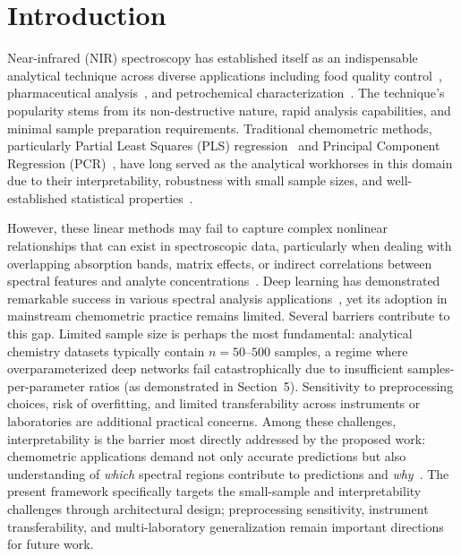 \documentclass[preprint,12pt]{elsarticle}
\begin{document}

\section{Introduction}


Near-infrared (NIR) spectroscopy has established itself as an indispensable analytical technique across diverse applications including food quality control~\cite{osborne1993practical},  pharmaceutical analysis~\cite{roggo2007review}, and petrochemical characterization~\cite{pasquini2018nir}. The technique's popularity stems from its non-destructive nature, rapid analysis capabilities, and minimal sample preparation requirements. Traditional chemometric methods, particularly Partial Least Squares (PLS) regression~\cite{wold2001pls} and Principal Component Regression (PCR)~\cite{naes1985comparison}, have long served as the analytical workhorses in this domain due to their interpretability, robustness with small sample sizes, and well-established statistical properties~\cite{martens1989multivariate}.

However, these linear methods may fail to capture complex nonlinear relationships that can exist in spectroscopic data, particularly when dealing with overlapping absorption bands, matrix effects, or indirect correlations between spectral features and analyte concentrations~\cite{mishra2021deep}. Deep learning has demonstrated remarkable success in various spectral analysis applications~\cite{acquarelli2017convolutional,cui2018modern,liu2021deep}, yet its adoption in mainstream chemometric practice remains limited. Several barriers contribute to this gap. Limited sample size is perhaps the most fundamental: analytical chemistry datasets typically contain $n=50$--$500$ samples, a regime where overparameterized deep networks fail catastrophically due to insufficient samples-per-parameter ratios (as demonstrated in Section~5). Sensitivity to preprocessing choices, risk of overfitting, and limited transferability across instruments or laboratories are additional practical concerns. Among these challenges, interpretability is the barrier most directly addressed by the proposed work: chemometric applications demand not only accurate predictions but also understanding of \textit{which} spectral regions contribute to predictions and \textit{why}~\cite{bjerrum2017data}. The present framework specifically targets the small-sample and interpretability challenges through architectural design; preprocessing sensitivity, instrument transferability, and multi-laboratory generalization remain important directions for future work.
\end{document}
